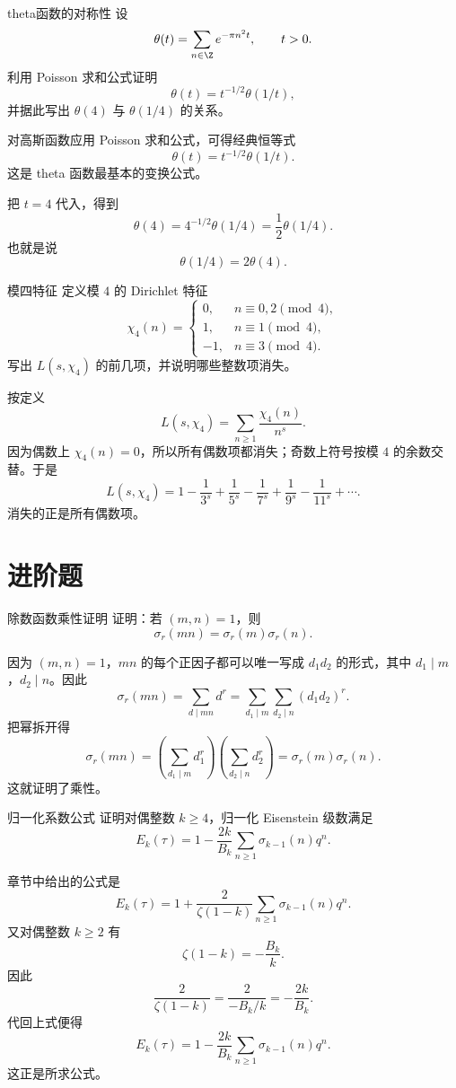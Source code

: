 \begin{problem}{theta函数的对称性}
\easy
设
\[
\theta(t)=\sum_{n\in\Z} e^{-\pi n^2 t},\qquad t>0.
\]
利用 Poisson 求和公式证明
\[
\theta(t)=t^{-1/2}\theta(1/t),
\]
并据此写出 $\theta(4)$ 与 $\theta(1/4)$ 的关系。
\end{problem}
\begin{solution}
对高斯函数应用 Poisson 求和公式，可得经典恒等式
\[
\theta(t)=t^{-1/2}\theta(1/t).
\]
这是 theta 函数最基本的变换公式。

把 $t=4$ 代入，得到
\[
\theta(4)=4^{-1/2}\theta(1/4)=\frac12\theta(1/4).
\]
也就是说
\[
\theta(1/4)=2\theta(4).
\]
\end{solution}

\begin{problem}{模四特征}
\easy
定义模 $4$ 的 Dirichlet 特征
\[
\chi_4(n)=
\begin{cases}
0,& n\equiv 0,2\pmod 4,\\
1,& n\equiv 1\pmod 4,\\
-1,& n\equiv 3\pmod 4.
\end{cases}
\]
写出 $L(s,\chi_4)$ 的前几项，并说明哪些整数项消失。
\end{problem}
\begin{solution}
按定义
\[
L(s,\chi_4)=\sum_{n\ge1}\frac{\chi_4(n)}{n^s}.
\]
因为偶数上 $\chi_4(n)=0$，所以所有偶数项都消失；奇数上符号按模 $4$ 的余数交替。于是
\[
L(s,\chi_4)=1-\frac1{3^s}+\frac1{5^s}-\frac1{7^s}+\frac1{9^s}-\frac1{11^s}+\cdots.
\]
消失的正是所有偶数项。
\end{solution}

\section{进阶题 \medium}

\begin{problem}{除数函数乘性证明}
\medium
证明：若 $(m,n)=1$，则
\[
\sigma_r(mn)=\sigma_r(m)\sigma_r(n).
\]
\end{problem}
\begin{solution}
因为 $(m,n)=1$，$mn$ 的每个正因子都可以唯一写成 $d_1d_2$ 的形式，其中 $d_1\mid m$，$d_2\mid n$。因此
\[
\sigma_r(mn)=\sum_{d\mid mn} d^r
=\sum_{d_1\mid m}\sum_{d_2\mid n}(d_1d_2)^r.
\]
把幂拆开得
\[
\sigma_r(mn)=\left(\sum_{d_1\mid m} d_1^r\right)
\left(\sum_{d_2\mid n} d_2^r\right)
=\sigma_r(m)\sigma_r(n).
\]
这就证明了乘性。
\end{solution}

\begin{problem}{归一化系数公式}
\medium
证明对偶整数 $k\ge 4$，归一化 Eisenstein 级数满足
\[
E_k(\tau)=1-\frac{2k}{B_k}\sum_{n\ge1}\sigma_{k-1}(n)q^n.
\]
\end{problem}
\begin{solution}
章节中给出的公式是
\[
E_k(\tau)=1+\frac{2}{\zeta(1-k)}\sum_{n\ge1}\sigma_{k-1}(n)q^n.
\]
又对偶整数 $k\ge 2$ 有
\[
\zeta(1-k)=-\frac{B_k}{k}.
\]
因此
\[
\frac{2}{\zeta(1-k)}=\frac{2}{-B_k/k}=-\frac{2k}{B_k}.
\]
代回上式便得
\[
E_k(\tau)=1-\frac{2k}{B_k}\sum_{n\ge1}\sigma_{k-1}(n)q^n.
\]
这正是所求公式。
\end{solution}

